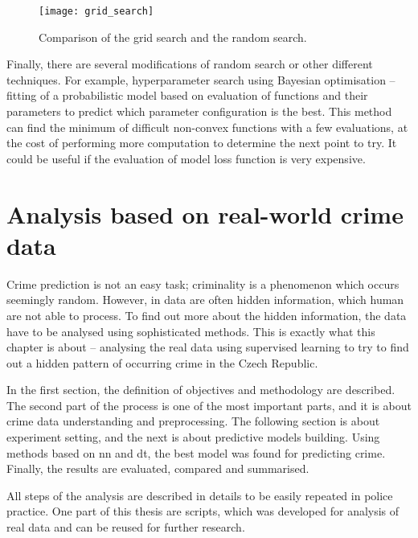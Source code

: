 \documentclass[thesis=M,english]{FITthesis}[2012/10/20]
\begin{document}
\begin{figure}[ht]\centering
    \texttt{[image: grid\_search]}
    \caption{Comparison of the grid search and the random search.\cite[284]{Bergstra2012rs}}\label{fig:search}
\end{figure}

Finally, there are several modifications of random search or other different techniques. For example, hyperparameter search using Bayesian optimisation -- fitting of a probabilistic model based on evaluation of functions and their parameters to predict which parameter configuration is the best.\cite{Snoek2012bopt} This method can find the minimum of difficult non-convex functions with a few evaluations, at the cost of performing more computation to determine the next point to try. It could be useful if the evaluation of model loss function is very expensive.


\chapter{Analysis based on real-world crime data}\label{analysis}

Crime prediction is not an easy task; criminality is a phenomenon which occurs seemingly random. However, in data are often hidden information, which human are not able to process. To find out more about the hidden information, the data have to be analysed using sophisticated methods. This is exactly what this chapter is about -- analysing the real data using supervised learning to try to find out a hidden pattern of occurring crime in the Czech Republic. 

In the first section, the definition of objectives and methodology are described. The second part of the process is one of the most important parts, and it is about crime data understanding and preprocessing. The following section is about experiment setting, and the next is about predictive models building. Using methods based on \gls{nn} and \gls{dt}, the best model was found for predicting crime. Finally, the results are evaluated, compared and summarised. 

All steps of the analysis are described in details to be easily repeated in police practice. One part of this thesis are scripts, which was developed for analysis of real data and can be reused for further research. 
\end{document}
